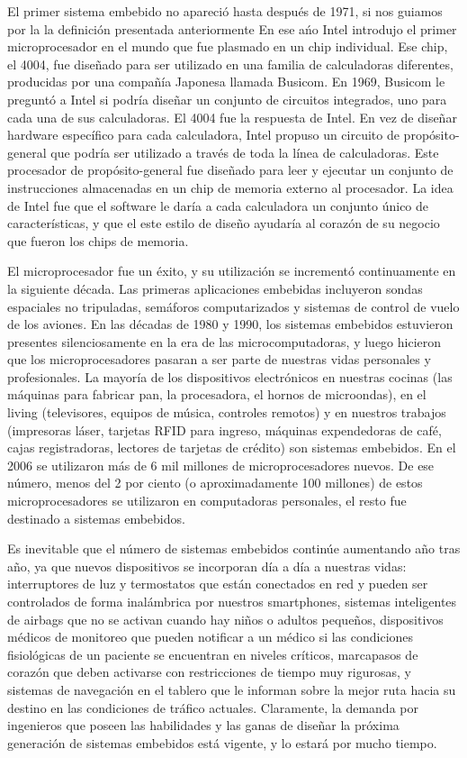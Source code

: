 \documentclass[output=paper, 
colorlinks,
citecolor=brown,
newtxmath
]{langscibook}
\begin{document}
El primer sistema embebido no apareció hasta después de 1971, si nos guiamos por la
la definición presentada anteriormente En ese ańo Intel introdujo el primer microprocesador en el mundo
que fue plasmado en un chip individual. Ese chip, el 4004, fue diseñado para ser utilizado 
en una familia de calculadoras diferentes, producidas por una compañía Japonesa llamada Busicom.
En 1969, Busicom le preguntó a Intel si podría diseñar un conjunto de circuitos integrados,
uno para cada una de sus calculadoras. El 4004 fue la respuesta de Intel. En vez de diseñar
hardware específico para cada calculadora, Intel propuso un circuito de propósito-general
que podría ser utilizado a través de toda la línea de calculadoras. Este procesador de propósito-general
fue diseñado para leer y ejecutar un conjunto de instrucciones almacenadas en un chip de memoria
externo al procesador. La idea de Intel fue que el software le daría a cada calculadora
un conjunto único de características, y que el este estilo de diseño ayudaría al corazón de su 
negocio que fueron los chips de memoria.



El microprocesador fue un éxito, y su utilización se incrementó continuamente en la siguiente
década. Las primeras aplicaciones embebidas incluyeron sondas espaciales no tripuladas, 
semáforos computarizados y sistemas de control de vuelo de los aviones.
En las décadas de 1980 y 1990, los sistemas embebidos estuvieron presentes silenciosamente
en la era de las microcomputadoras, y luego hicieron que los microprocesadores
pasaran a ser parte de nuestras vidas personales y profesionales.
La mayoría de los dispositivos electrónicos en nuestras cocinas (las máquinas para fabricar pan, la procesadora,
el hornos de microondas), en el living (televisores, equipos de música, controles remotos) y 
en nuestros trabajos (impresoras láser, tarjetas RFID para ingreso, máquinas expendedoras de café,
cajas registradoras, lectores de tarjetas de crédito) son sistemas embebidos.
En el 2006 se utilizaron más de 6 mil millones de microprocesadores nuevos. 
De ese número, menos del 2 por ciento (o aproximadamente 100 millones) de estos microprocesadores 
se utilizaron en computadoras personales, el resto fue destinado a sistemas embebidos.


Es inevitable que el número de sistemas embebidos continúe aumentando año tras año,
ya que nuevos dispositivos se incorporan día a día a nuestras vidas: interruptores de luz y termostatos 
que están conectados en red y pueden ser controlados de forma inalámbrica por nuestros smartphones,
sistemas inteligentes de airbags que no se activan cuando hay niños o adultos pequeños, 
dispositivos médicos de monitoreo que pueden notificar a un médico si las condiciones 
fisiológicas de un paciente se encuentran en niveles críticos, marcapasos de corazón que deben
activarse con restricciones de tiempo muy rigurosas, y sistemas de navegación 
en el tablero que le informan sobre la mejor ruta hacia su destino en las condiciones de 
tráfico actuales. 
Claramente, la demanda por ingenieros que poseen las habilidades y las ganas de diseñar 
la próxima generación de sistemas embebidos está vigente, y lo estará por mucho tiempo.
\end{document}
